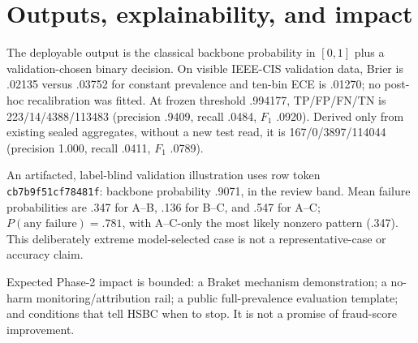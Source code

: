 \documentclass[10pt,a4paper]{article}
\begin{document}
\section{Outputs, explainability, and impact}

The deployable output is the classical backbone probability in $[0,1]$ plus a
validation-chosen binary decision. On visible IEEE-CIS validation data, Brier
is .02135 versus .03752 for constant prevalence and ten-bin ECE is .01270; no
post-hoc recalibration was fitted. At frozen threshold .994177,
TP/FP/FN/TN is 223/14/4388/113483 (precision .9409, recall .0484, $F_1$
.0920). Derived only from existing sealed aggregates, without a new test
read, it is 167/0/3897/114044 (precision 1.000, recall .0411, $F_1$ .0789).

An artifacted, label-blind validation illustration uses row token
\texttt{cb7b9f51cf78481f}: backbone probability .9071, in the review band.
Mean failure probabilities are .347 for A--B, .136 for B--C, and .547 for
A--C; $P(\text{any failure})=.781$, with A--C-only the most likely nonzero
pattern (.347). This deliberately extreme model-selected case is not a
representative-case or accuracy claim.

Expected Phase-2 impact is bounded: a Braket mechanism demonstration; a
no-harm monitoring/attribution rail; a public full-prevalence evaluation
template; and conditions that tell HSBC when to stop. It is not a promise of
fraud-score improvement.
\end{document}
